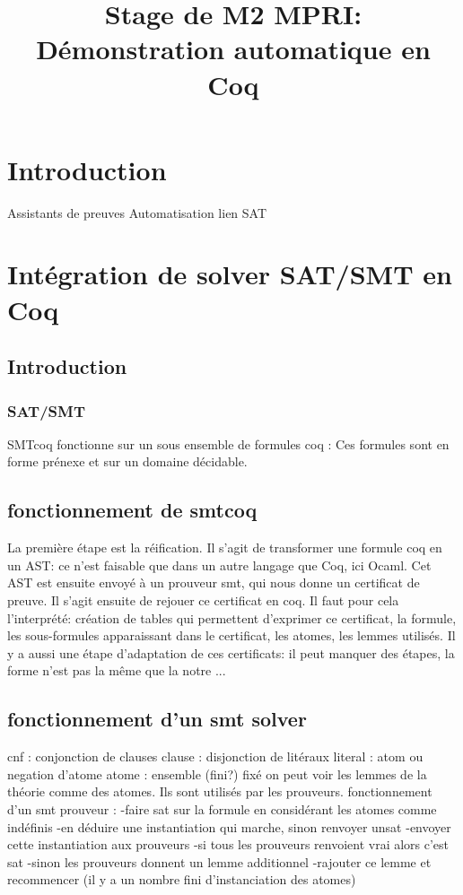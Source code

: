 \title{Stage de M2 MPRI: Démonstration automatique en Coq}

\section{Introduction}
Assistants de preuves 
Automatisation 
lien SAT

\newpage



\section{Intégration de solver SAT/SMT en Coq}

\subsection{Introduction}
\subsubsection{SAT/SMT}
SMTcoq fonctionne sur un sous ensemble de formules coq :
Ces formules sont en forme prénexe et sur un domaine décidable.

\subsection{fonctionnement de smtcoq}
La première étape est la réification. Il s'agit de transformer une formule coq en un AST:
ce n'est faisable que dans un autre langage que Coq, ici Ocaml.
Cet AST est ensuite envoyé à un prouveur smt, qui nous donne un certificat de preuve.
Il s'agit ensuite de rejouer ce certificat en coq. Il faut pour cela l'interprété: création
de tables qui permettent d'exprimer ce certificat, la formule, les sous-formules apparaissant
dans le certificat, les atomes, les lemmes utilisés. Il y a aussi une étape d'adaptation de ces
certificats: il peut manquer des étapes, la forme n'est pas la même que la notre ...

\subsection{fonctionnement d'un smt solver}
cnf : conjonction de clauses
clause : disjonction de litéraux
literal : atom ou negation d'atome
atome : ensemble (fini?) fixé
on peut voir les lemmes de la théorie comme des atomes. Ils sont utilisés par les prouveurs.
fonctionnement d'un smt prouveur :
-faire sat sur la formule en considérant les atomes comme indéfinis
-en déduire une instantiation qui marche, sinon renvoyer unsat
-envoyer cette instantiation aux prouveurs
-si tous les prouveurs renvoient vrai alors c'est sat
-sinon les prouveurs donnent un lemme additionnel
-rajouter ce lemme et recommencer (il y a un nombre fini d'instanciation des atomes)

